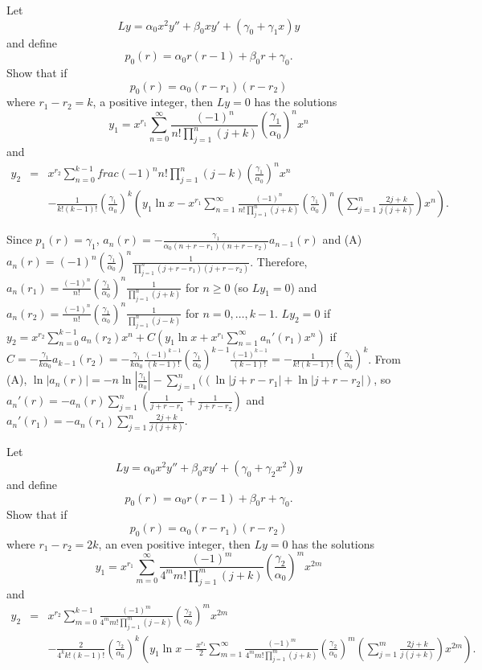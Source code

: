 \documentclass{ximera}
\begin{document}
\begin{problem}\label{exer:7.7.46}
Let
$$
Ly=\alpha_0x^2y''+\beta_0xy'+(\gamma_0+\gamma_1x)y
$$
and define
$$
p_0(r)=\alpha_0r(r-1)+\beta_0r+\gamma_0.
$$
Show that if
$$
p_0(r)=\alpha_0(r-r_1)(r-r_2)
$$
where $r_1-r_2=k$, a positive integer, then $Ly=0$ has the solutions
$$
y_1=x^{r_1}\sum_{n=0}^\infty \frac{(-1)^n}{
n!\prod_{j=1}^n(j+k)}\left(\frac{\gamma_1}{\alpha_0}\right)^n x^n
$$
and
\begin{eqnarray*}
y_2&=&x^{r_2}\sum_{n=0}^{k-1} frac{(-1)^n}{ n!\prod_{j=1}^n(j-k)}
\left(\frac{\gamma_1}{\alpha_0}\right)^n
x^n\\[10pt]&&-\frac{1}{
k!(k-1)!}\left(\frac{\gamma_1}{\alpha_0}\right)^k\left(y_1\ln x-
x^{r_1}\sum_{n=1}^\infty \frac{(-1)^n}{
n!\prod_{j=1}^n(j+k)}\left(\frac{\gamma_1}{\alpha_0}\right)^n
\left(\sum_{j=1}^n\frac{2j+k}{ j(j+k)}\right)x^n\right).
\end{eqnarray*}

\begin{solution}
    Since $p_1(r)=\gamma_1$,
$a_n(r)=-\frac{\gamma_1}{\alpha_0(n+r-r_1)(n+r-r_2)}a_{n-1}(r)$ and
(A) $a_n(r)=(-1)^n\left(\frac{\gamma_1}{\alpha_0}\right)^n
\frac{1}{\prod_{j=1}^n(j+r-r_1)(j+r-r_2)}$. Therefore,
$a_n(r_1)=\frac{(-1)^n}{ n!}\left(\frac{\gamma_1}{\alpha_0}\right)^n
\frac{1}{\prod_{j=1}^n(j+k)}$ for $n\geq 0$ (so $Ly_1=0$) and
$a_n(r_2)=\frac{(-1)^n}{ n!}\left(\frac{\gamma_1}{\alpha_0}\right)^n
\frac{1}{\prod_{j=1}^n(j-k)}$ for $n=0,\dots,k-1$. $Ly_2=0$ if $y_2=
x^{r_2}\sum_{n=0}^{k-1} a_n(r_2)x^n+C\left(y_1\ln x+
x^{r_1}\sum_{n=1}^\infty a_n'(r_1)x^n\right)$ if
$C=-\frac{\gamma_1}{ k\alpha_0}a_{k-1}(r_2)=-\frac{\gamma_1}{
k\alpha_0}\frac{(-1)^{k-1}}{(k-1)!}
\left(\frac{\gamma_1}{\alpha_0}\right)^{k-1}\frac{(-1)^{k-1}}{(k-1)!}
=-\frac{1}{ k!(k-1)!} \left(\frac{\gamma_1}{\alpha_0}\right)^k$. From (A),
$\ln|a_n(r)|=-n\ln\left|\frac{\gamma_1}{\alpha_0}\right|
-\sum_{j=1}^n(\left(\ln|j+r-r_1|+\ln|j+r-r_2|\right)$, so
$a_n'(r)=-a_n(r)\sum_{j=1}^n\left(\frac{1}{ j+r-r_1}+ \frac{1}{
j+r-r_2}\right)$ and $a_n'(r_1)=-a_n(r_1)\sum_{j=1}^n \frac{2j+k}{
j(j+k)}$.

\end{solution}
\end{problem}

\begin{problem}\label{exer:7.7.47}
Let
$$
Ly=\alpha_0x^2y''+\beta_0xy'+(\gamma_0+\gamma_2x^2)y
$$
and define
$$
p_0(r)=\alpha_0r(r-1)+\beta_0r+\gamma_0.
$$
Show that if
$$
p_0(r)=\alpha_0(r-r_1)(r-r_2)
$$
where $r_1-r_2=2k$, an even  positive integer, then $Ly=0$ has the
solutions
$$
y_1=x^{r_1}\sum_{m=0}^\infty \frac{(-1)^m}{
4^mm!\prod_{j=1}^m(j+k)}\left(\frac{\gamma_2}{\alpha_0}\right)^m x^{2m}
$$
and
\begin{eqnarray*}
y_2&=&x^{r_2}\sum_{m=0}^{k-1} \frac{(-1)^m}{4^mm!\prod_{j=1}^m(j-k)}
\left(\frac{\gamma_2}{\alpha_0}\right)^m
x^{2m}\\[10pt]&&-\frac{2}{
4^kk!(k-1)!}\left(\frac{\gamma_2}{\alpha_0}\right)^k\left(y_1\ln x-
\frac{x^{r_1}}{2}\sum_{m=1}^\infty \frac{(-1)^m}{
4^mm!\prod_{j=1}^m(j+k)}\left(\frac{\gamma_2}{\alpha_0}\right)^m
\left(\sum_{j=1}^m\frac{2j+k}{ j(j+k)}\right)x^{2m}\right).
\end{eqnarray*}
\end{problem}
\end{document}
